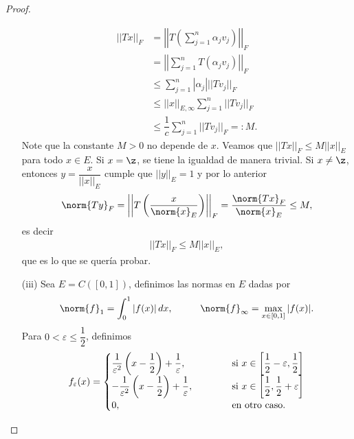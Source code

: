 \begin{proof}
\begin{enumerate}
   \begin{align*}
        ||Tx||_F&=\left|\left|T\left(\sum_{j=1}^n \alpha_jv_j\right)\right|\right|_F\\
        &= \left|\left|\sum_{j=1}^nT(\alpha_jv_j)\right|\right|_F\\
        &\leq \sum_{j=1}^n|\alpha_j|||Tv_j||_F\\
        &\leq ||x||_{E,\infty}\sum_{j=1}^n||Tv_j||_F\\
       &\leq \dfrac{1}{c}\sum_{j=1}^n ||Tv_j||_F=:M.
   \end{align*}
   Note que la constante $M>0$ no depende de $x$. Veamos que $||Tx||_F\leq M||x||_E$ para todo $x \in E$. Si $x=\z$, se tiene la igualdad de manera trivial. Si $x\neq \z$, entonces $y=\dfrac{x}{||x||_E}$ cumple que $||y||_E=1$ y por lo anterior
   \begin{align*}
       \norm{Ty}_F=\left|\left|T\left(\frac{x}{\norm{x}_E}\right)\right|\right|_F=\frac{\norm{Tx}_F}{\norm{x}_E}\leq M,
   \end{align*}
   es decir
   \begin{align*}
       ||Tx||_F\leq M||x||_E,
   \end{align*}
   que es lo que se quería probar.
   \item[(iii)] Sea $E=C([0,1])$, definimos las normas en $E$ dadas por
    \begin{align*}
       \norm{f}_1=\int_0^1 |f(x)|\, dx, \hspace{10mm} \norm{f}_\infty=\max_{x \in [0,1]}|f(x)|.
    \end{align*}
    Para $0<\varepsilon\leq \dfrac{1}{2}$, definimos 
    \begin{align*}
        f_\varepsilon(x)=\begin{cases}
            \displaystyle\frac{1}{\varepsilon^2}\left(x-\frac{1}{2}\right)+\frac{1}{\varepsilon}, \hspace{10mm} &\text{ si } x\in \left[\dfrac{1}{2}-\varepsilon,\dfrac{1}{2}\right]\\
            \displaystyle -\frac{1}{\varepsilon^2}\left(x-\frac{1}{2}\right)+\frac{1}{\varepsilon}, \hspace{10mm} &\text{ si } x \in \left[\dfrac{1}{2},\dfrac{1}{2}+\varepsilon\right]\\
            0, \hspace{10mm} &\text{ en otro caso.}
        \end{cases}
        \end{align*}
        \begin{figure}[H]

\end{figure}
\end{enumerate}
\end{proof}

